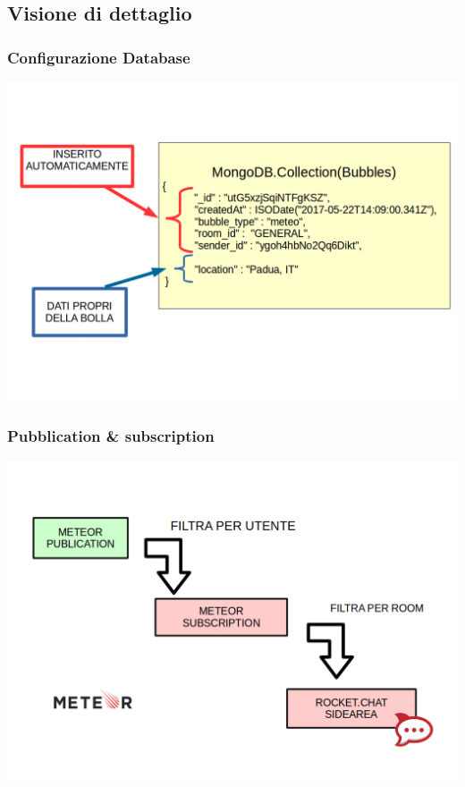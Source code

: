 \subsection{Visione di dettaglio}

\begin{frame}
  \frametitle{Configurazione Database }
  \begin{center}
    \includegraphics[scale=0.28]{img/1mongo.png}
  \end{center}
\end{frame}


\begin{frame}
  \frametitle{Pubblication \& subscription }
  \begin{center}
    \includegraphics[scale=0.28]{img/3publication.png}
  \end{center}
\end{frame}


